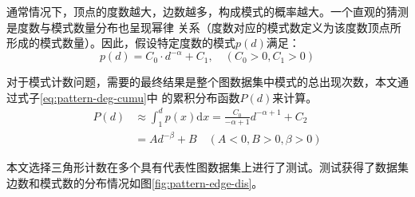 \documentclass[master]{thesis-uestc}
\begin{document}
    通常情况下，顶点的度数越大，边数越多，构成模式的概率越大。一个直观的猜测是度数与模式数量分布也呈现幂律
关系（度数对应的模式数定义为该度数顶点所形成的模式数量）。因此，假设特定度数的模式$p(d)$满足：
\begin{equation}
    p(d)=C_0 \cdot d^{-\alpha}+C_1, \quad\left(C_0>0, C_1>0\right)
    \label{eq:pattern-deg}
\end{equation}

    对于模式计数问题，需要的最终结果是整个图数据集中模式的总出现次数，本文通过式子\ref{eq:pattern-deg-cumu}中
的累积分布函数$P(d)$来计算。
\begin{equation}
    \label{eq:pattern-deg-cumu}
    \begin{split}
    P(d) & \approx \int_1^d{p(x)}\mathrm{d}x = \frac{C_0}{-\alpha+1}d^{-\alpha+1} + C_2 \\
        & = Ad^{-\beta} + B \quad (A < 0, B > 0, \beta > 0)
    \end{split}
\end{equation}

    本文选择三角形计数在多个具有代表性图数据集上进行了测试。测试获得了数据集边数和模式数的分布情况如图\ref{fig:pattern-edge-dis}。
\end{document}

